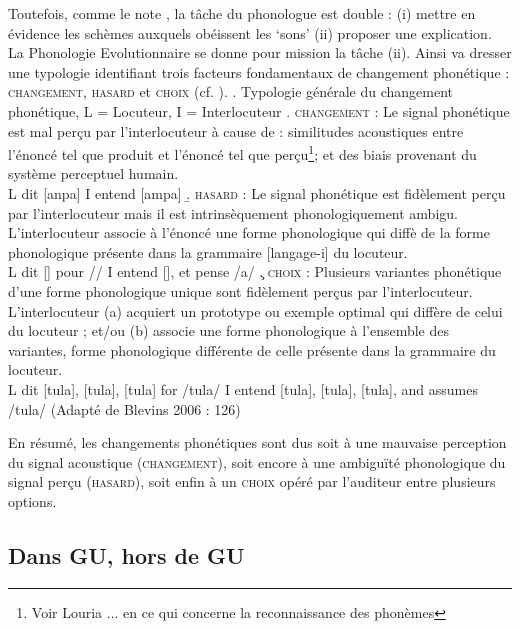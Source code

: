 	  Toutefois, comme le note \cite{blevins2004evolutionary}, la t\^ache du phonologue est double : (i) mettre en \'evidence les sch\`emes auxquels ob\'eissent les `sons' (ii) proposer une explication. La Phonologie Evolutionnaire se donne pour mission la t\^ache (ii). 
	  Ainsi \cite{blevins2004evolutionary} va dresser une typologie identifiant trois facteurs fondamentaux de changement phon\'etique : \textsc{changement}, \textsc{hasard} et \textsc{choix} (cf. \Next).
	  \ex.	Typologie g\'en\'erale du changement phon\'etique, L = Locuteur, I = Interlocuteur
	  \a. \textsc{changement} : Le signal phon\'etique est mal per\c cu par l'interlocuteur \`a cause de : similitudes acoustiques entre l'\'enonc\'e tel que produit et l'\'enonc\'e tel que per\c cu\footnote{Voir Louria ... en ce qui concerne la reconnaissance des phon\`emes}; et des biais provenant du syst\`eme perceptuel humain.\\
	  L dit [anpa] I entend [ampa]
	  \b. \textsc{hasard} : Le signal phon\'etique est fid\`element per\c cu par l'interlocuteur mais il est  intrins\`equement phonologiquement ambigu. L'interlocuteur associe \`a l'\'enonc\'e une forme phonologique qui diff\`e de la forme phono\-logique pr\'esente dans la grammaire [langage-i] du locuteur.\\
	  L dit [\cdgl{}\cdgl] pour /\cdgl/ I entend [\cdgl{}\cdgl], et pense /\cdgl a/
	  \c. \textsc{choix} : Plusieurs variantes phon\'etique d'une forme phonologique uni\-que sont fid\`element per\c cus par l'interlocuteur. L'interlocuteur (a) acquiert un prototype ou exemple optimal qui diff\`ere de celui du locuteur ; et/ou (b) associe une forme phonologique \`a l'ensemble des variantes, forme phonologique diff\'erente de celle pr\'esente dans la grammaire du locuteur.\\ 
	  L dit [tu\cdgl\schwa la\Ng], [tu\cdgl\schwa la\Ng], [tu\cdgl la\Ng] for /tu\cdgl\schwa la\Ng/
	  I entend [tu\cdgl\schwa la\Ng], [tu\cdgl\schwa la\Ng], [tu\cdgl la\Ng], and assumes /tu\cdgl la\Ng/
	  \hfill (Adapt\'e de Blevins 2006 : 126)
	  
	  En r\'esum\'e, les changements phon\'etiques sont dus soit \`a une mauvaise perception du signal acoustique (\textsc{changement}), soit encore \`a une ambigu\"it\'e phonologique du signal per\c cu (\textsc{hasard}), soit enfin \`a un \textsc{choix} op\'er\'e par l'auditeur entre plusieurs options. 
	  
	\subsection{Dans GU, hors de GU}
